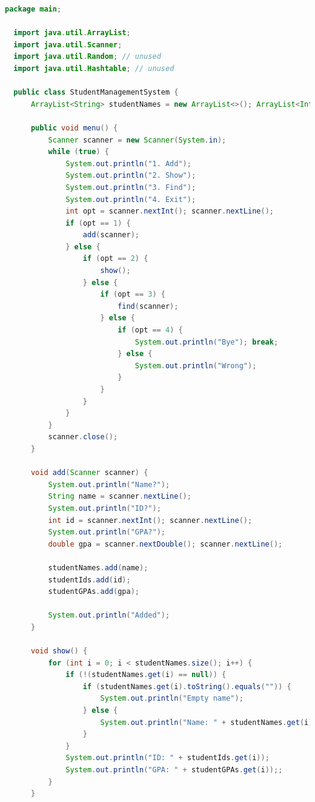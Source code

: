 \documentclass[a4paper,12pt]{article}
\begin{document}
\begin{lstlisting}[language=Java, caption={Original Test Subject Java Code}, label={lst:test-subject}]
  package main;

  import java.util.ArrayList;
  import java.util.Scanner;
  import java.util.Random; // unused
  import java.util.Hashtable; // unused
  
  public class StudentManagementSystem {
      ArrayList<String> studentNames = new ArrayList<>(); ArrayList<Integer> studentIds = new ArrayList<>(); ArrayList<Double> studentGPAs = new ArrayList<>();;
  
      public void menu() {
          Scanner scanner = new Scanner(System.in);
          while (true) {
              System.out.println("1. Add");
              System.out.println("2. Show");
              System.out.println("3. Find");
              System.out.println("4. Exit");
              int opt = scanner.nextInt(); scanner.nextLine();
              if (opt == 1) {
                  add(scanner);
              } else {
                  if (opt == 2) {
                      show();
                  } else {
                      if (opt == 3) {
                          find(scanner);
                      } else {
                          if (opt == 4) {
                              System.out.println("Bye"); break;
                          } else {
                              System.out.println("Wrong");
                          }
                      }
                  }
              }
          }
          scanner.close();
      }
  
      void add(Scanner scanner) {
          System.out.println("Name?");
          String name = scanner.nextLine();
          System.out.println("ID?");
          int id = scanner.nextInt(); scanner.nextLine();
          System.out.println("GPA?");
          double gpa = scanner.nextDouble(); scanner.nextLine();
  
          studentNames.add(name);
          studentIds.add(id);
          studentGPAs.add(gpa);
  
          System.out.println("Added");
      }
  
      void show() {
          for (int i = 0; i < studentNames.size(); i++) {
              if (!(studentNames.get(i) == null)) {
                  if (studentNames.get(i).toString().equals("")) {
                      System.out.println("Empty name");
                  } else {
                      System.out.println("Name: " + studentNames.get(i));
                  }
              }
              System.out.println("ID: " + studentIds.get(i));
              System.out.println("GPA: " + studentGPAs.get(i));;
          }
      }
  

\end{lstlisting}
\end{document}
